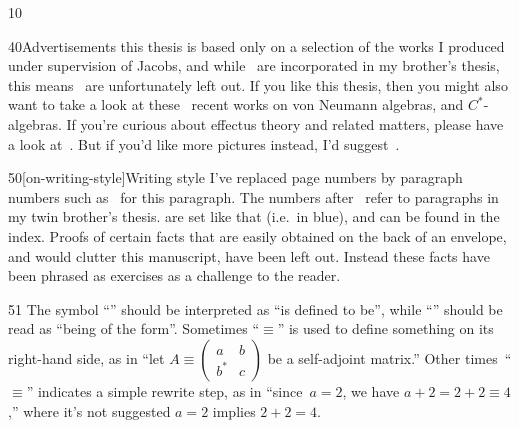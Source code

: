 \documentclass[b5paper]{book}
\begin{document}
\begin{parsec}{10}
\begin{point}{40}{Advertisements}
this thesis is based only on a selection
\cite{model,cho2015quotient,cho2016duplicable,qpakm,westerbaan2016universal}
of the works
I produced under supervision of Jacobs,
and while~\cite{wwpaschke,effintro,statesofconvexsets}
are incorporated in my brother's thesis,
this means~\cite{jacobs2015effect,jacobs2017distances} 
are unfortunately left out.
If you like this thesis,
then
you might also want to take a look
at these~\cite{rennela2017infinite,
rennela2015complete,
furber2013kleisli,
kornell2012,
heunen2015domains,
Maassen2010} recent works on von Neumann algebras,
and $C^*$-algebras.
If you're curious
about effectus theory
and related matters,
please have a look at~\cite{jacobs2017quantum,
cho2017disintegration,
jacobs2016hyper,
jacobs2017channel,
jacobs2017formal,
cho2017efprob,
jacobs2017probability,
jacobs2017recipe,
jacobs2016effectuses,
jacobs2016affine,
jacobs2016relating,
effintro,
statesofconvexsets,
cho2015quotient,
jacobs2017distances,
jacobs2015effect,
jacobs2016expectation,
jacobs2016predicate,
newdirections}.
But if you'd like more pictures instead,
I'd suggest~\cite{coecke2017picturing}.
\end{point}
\begin{point}{50}[on-writing-style]{Writing style}
I've replaced page numbers by
paragraph numbers
such as~
for this paragraph.
The numbers after~ refer to paragraphs
	in my twin brother's thesis\cite{bas}.
 are set like that
(i.e.~in blue),
and can be found in the index.
Proofs of certain facts
that are easily obtained on the back of an envelope,
and would clutter this manuscript,
have been left out.
Instead these facts have been phrased as exercises
as a challenge to the reader.
\end{point}
\begin{point}{51}
    The symbol ``\Define{$:=$}''
should be interpreted as ``is defined to be'',
    while ``\Define{$\equiv$}''
should be read as ``being of the form''.
Sometimes ``$\equiv$'' is
used to define something on its right-hand side,
as in ``let $A\equiv\left(
\begin{smallmatrix} a&b\\b^* &c\end{smallmatrix}
\right)$ be a self-adjoint matrix.''
Other times~``$\equiv$''
indicates a simple rewrite step, as in
``since~$a=2$, we have $a+2=2+2\equiv 4$,''
where it's not suggested $a=2$ implies $2+2=4$.
\end{point}

\end{parsec}
\end{document}
